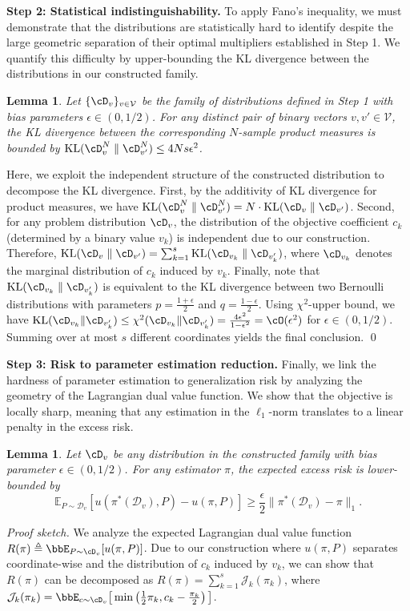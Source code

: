 \documentclass{article}
\theoremstyle{plain}
\newtheorem{lemma}[theorem]{Lemma}
\theoremstyle{definition}
\theoremstyle{remark}
\begin{document}
\textbf{Step 2: Statistical indistinguishability.} To apply Fano's inequality, we must demonstrate that the distributions are statistically hard to identify despite the large geometric separation of their optimal multipliers established in Step 1. We quantify this difficulty by upper-bounding the KL divergence between the distributions in our constructed family.

\begin{lemma} \label{lm:lower-bound-step-2}
    Let $\{\cD_v\}_{v \in \mathcal V}$ be the family of distributions defined in Step 1 with bias parameters $\epsilon \in (0, 1/2)$. For any distinct pair of binary vectors $v, v' \in \mathcal V$, the KL divergence between the corresponding $N$-sample product measures is bounded by $\textup{KL}(\cD_{v}^N \parallel \cD_{v'}^N) \leq 4Ns\epsilon^2$.
\end{lemma}
\proof 
    Here, we exploit the independent structure of the constructed distribution to decompose the KL divergence. First, by the additivity of KL divergence for product measures, we have $\textup{KL}(\cD_{v}^N \parallel \cD_{v'}^N) = N \cdot \textup{KL}(\cD_{v} \parallel \cD_{v'})$. Second, for any problem distribution $\cD_v$, the distribution of the objective coefficient $c_k$ (determined by a binary value $v_k$) is independent due to our construction. Therefore, $\textup{KL}(\cD_v \parallel \cD_{v'}) = \sum_{k = 1}^s \textup{KL}(\cD_{v_k} \parallel \cD_{v_k'})$, where $\cD_{v_k}$ denotes the marginal distribution of $c_k$ induced by $v_k$. Finally, note that $\textup{KL}(\cD_{v_k} \parallel \cD_{v_k'})$ is equivalent to the KL divergence between two Bernoulli distributions with parameters $p = \frac{1 + \epsilon}{2}$ and $q = \frac{1 - \epsilon}{2}$. Using $\chi^2$-upper bound, we have $\textup{KL}(\cD_{v_k} \| \cD_{v'_k}) \leq \chi^2(\cD_{v_k} \| \cD_{v'_k}) = \frac{4\epsilon^2}{1 - \epsilon^2} = \cO(\epsilon^2)$ for $\epsilon \in (0, 1/2)$. Summing over at most $s$ different coordinates yields the final conclusion.
\qed

\textbf{Step 3: Risk to parameter estimation reduction.} Finally, we link the hardness of parameter estimation to generalization risk by analyzing the geometry of the Lagrangian dual value function. We show that the objective is locally sharp, meaning that any estimation in the $\ell_1$-norm translates to a linear penalty in the excess risk. 
\begin{lemma} \label{lm:lower-bound-step-3}
    Let $\cD_v$ be any distribution in the constructed family with bias parameter $\epsilon \in (0, 1/2)$. For any estimator $\pi$, the expected excess risk is lower-bounded by
    \[
        \mathbb{E}_{P \sim \mathcal{D}_v}[u(\pi^*(\mathcal{D}_v), P) - u(\pi, P)] \ge \frac{\epsilon}{2} \|\pi^*(\mathcal{D}_v) - \pi\|_1.
    \]
\end{lemma}
\textit{Proof sketch.}
    We analyze the expected Lagrangian dual value function $R(\pi) \triangleq \bbE_{P \sim \cD_v}[u(\pi, P)]$. Due to our construction where $u(\pi, P)$ separates coordinate-wise and the distribution of $c_k$ induced by $v_k$, we can show that $R(\pi)$ can be decomposed as $R(\pi) = \sum_{k = 1}^s \mathcal J_k(\pi_k)$, where $\mathcal J_k(\pi_k) = \bbE_{c \sim \cD_v}\big[\min\left(\frac{1}{2}\pi_k, c_k - \frac{\pi_k}{2}\right)\big]$.
\end{document}
